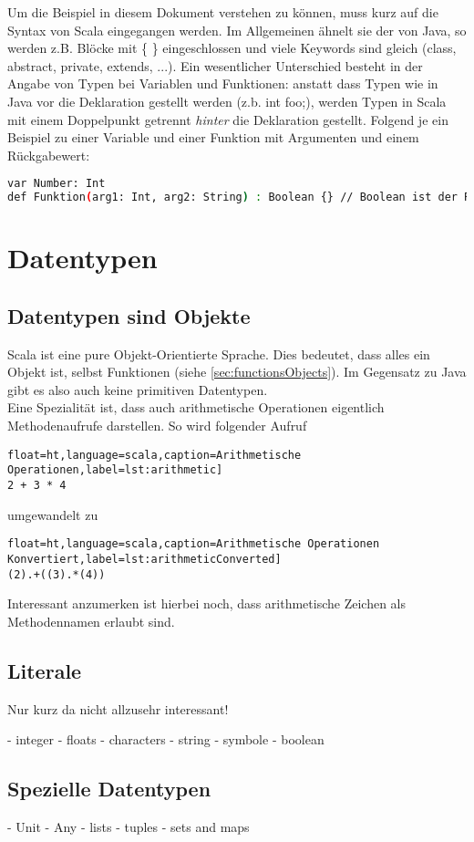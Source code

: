 Um die Beispiel in diesem Dokument verstehen zu können, muss kurz auf
die Syntax von Scala eingegangen werden. Im Allgemeinen ähnelt sie der
von Java, so werden z.B. Blöcke mit \{ \} eingeschlossen und viele
Keywords sind gleich (class, abstract, private, extends, ...).
Ein wesentlicher Unterschied besteht in der Angabe von Typen bei Variablen
und Funktionen: anstatt dass Typen wie in Java vor die Deklaration gestellt
werden (z.b. int foo;), werden Typen in Scala mit einem Doppelpunkt getrennt
\emph{hinter} die Deklaration gestellt. Folgend je ein Beispiel zu einer Variable
und einer Funktion mit Argumenten und einem Rückgabewert:

\begin{lstlisting}[float=ht,language=bash,caption=Typenangabe,label=lst:types]
var Number: Int
def Funktion(arg1: Int, arg2: String) : Boolean {} // Boolean ist der Rueckgabewert
\end{lstlisting}


\section{Datentypen}
\label{sec:datatypes}

\subsection{Datentypen sind Objekte}

Scala ist eine pure Objekt-Orientierte Sprache. Dies bedeutet, dass alles
ein Objekt ist, selbst Funktionen (siehe \ref{sec:functionsObjects}). Im
Gegensatz zu Java gibt es also auch keine primitiven Datentypen.\\

Eine Spezialität ist, dass auch arithmetische Operationen eigentlich
Methodenaufrufe darstellen. So wird folgender Aufruf

\begin{lstlisting}float=ht,language=scala,caption=Arithmetische Operationen,label=lst:arithmetic]
2 + 3 * 4
\end{lstlisting}

umgewandelt zu
\begin{lstlisting}float=ht,language=scala,caption=Arithmetische Operationen Konvertiert,label=lst:arithmeticConverted]
(2).+((3).*(4))
\end{lstlisting}

Interessant anzumerken ist hierbei noch, dass arithmetische Zeichen
als Methodennamen erlaubt sind.

\subsection{Literale}
Nur kurz da nicht allzusehr interessant!

- integer
- floats
- characters
- string
- symbole
- boolean


\subsection{Spezielle Datentypen}

- Unit
- Any
- lists
- tuples
- sets and maps
